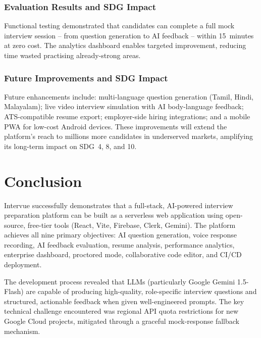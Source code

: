 \documentclass{fisatprojectfinal}
\begin{document}
\subsection{Evaluation Results and SDG Impact}
Functional testing demonstrated that candidates can complete a full mock interview session
-- from question generation to AI feedback -- within 15~minutes at zero cost. The analytics
dashboard enables targeted improvement, reducing time wasted practising already-strong areas.

\subsection{Future Improvements and SDG Impact}
Future enhancements include: multi-language question generation (Tamil, Hindi, Malayalam);
live video interview simulation with AI body-language feedback; ATS-compatible resume export;
employer-side hiring integrations; and a mobile PWA for low-cost Android devices. These
improvements will extend the platform's reach to millions more candidates in underserved
markets, amplifying its long-term impact on SDG~4, 8, and 10.

\chapter{Conclusion}
Intervue successfully demonstrates that a full-stack, AI-powered interview preparation
platform can be built as a serverless web application using open-source, free-tier tools
(React, Vite, Firebase, Clerk, Gemini). The platform achieves all nine primary objectives:
AI question generation, voice response recording, AI feedback evaluation, resume analysis,
performance analytics, enterprise dashboard, proctored mode, collaborative code editor, and
CI/CD deployment.

The development process revealed that LLMs (particularly Google Gemini 1.5-Flash) are
capable of producing high-quality, role-specific interview questions and structured,
actionable feedback when given well-engineered prompts. The key technical challenge
encountered was regional API quota restrictions for new Google Cloud projects, mitigated
through a graceful mock-response fallback mechanism.
\end{document}
